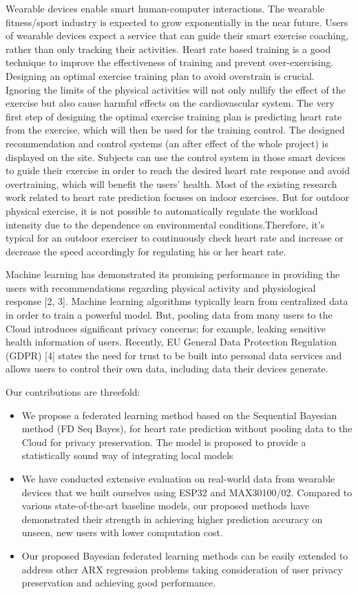 \documentclass[journal,transmag]{IEEEtran}
\begin{document}
Wearable devices enable smart human-computer interactions. The wearable fitness/sport industry is  expected to grow exponentially in the near future. Users of wearable devices expect a service that can guide their smart exercise coaching, rather than only tracking their activities. Heart rate based training is a good technique to improve the effectiveness of training and prevent over-exercising. Designing an optimal exercise training plan to avoid overstrain is crucial. Ignoring the limits of the physical activities will not only nullify the effect of the exercise but also cause harmful effects on the cardiovascular system. The very first step of designing the optimal exercise training plan is predicting heart rate from the exercise, which will then be used for the training control. The designed recommendation and control systems (an after effect of the whole project) is displayed on the site. Subjects can use the control system in those smart devices to guide their exercise in order to reach the desired heart rate response and avoid overtraining, which will benefit the users’ health. Most of the existing research work related to heart rate prediction focuses on indoor exercises. But for outdoor physical exercise, it is not possible to automatically regulate the workload intensity due to the dependence on environmental conditions.Therefore, it’s typical for an outdoor exerciser to continuously check heart rate and increase or decrease the speed accordingly for regulating his or her heart rate.

Machine learning has demonstrated its promising performance in providing the users with recommendations regarding physical activity and physiological response [2, 3]. Machine learning algorithms typically learn from centralized data in order to train a powerful model. But, pooling data from many users to the Cloud introduces significant privacy concerns; for example, leaking sensitive health information of users. Recently, EU General Data Protection Regulation (GDPR) [4] states the need for trust to be built into personal data services and allows users to control their own data, including data their devices generate.

Our contributions are threefold:
\begin{itemize}
  \item We propose a federated learning method based on the Sequential Bayesian method (FD Seq Bayes), for heart rate prediction without pooling data to the Cloud for privacy preservation. The model is proposed to provide a statistically sound way of integrating local models
  \item We have conducted extensive evaluation on real-world data from wearable devices that we built ourselves using ESP32 and MAX30100/02. Compared to various state-of-the-art baseline models, our proposed methods have demonstrated their strength in achieving higher prediction accuracy on unseen, new users with lower computation cost.
  \item Our proposed Bayesian federated learning methods can be easily extended to address other ARX regression problems taking consideration of user privacy preservation and achieving good performance.

\end{itemize}
\end{document}
